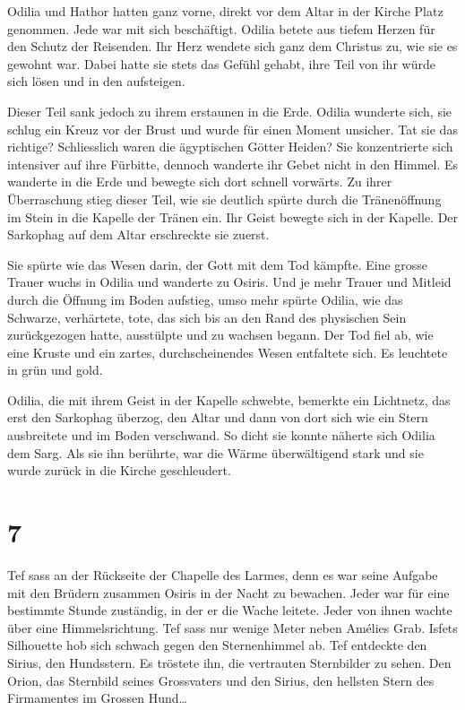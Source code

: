 \sterne

Odilia und Hathor hatten ganz vorne, direkt vor dem Altar in der Kirche Platz genommen. Jede war mit sich beschäftigt. Odilia betete aus tiefem Herzen für den Schutz der Reisenden. Ihr Herz wendete sich ganz dem Christus zu, wie sie es gewohnt war. Dabei hatte sie stets das Gefühl gehabt, ihre Teil von ihr würde sich lösen und in den aufsteigen. 

Dieser Teil sank jedoch zu ihrem erstaunen in die Erde. Odilia wunderte sich, sie schlug ein Kreuz vor der Brust und wurde für einen Moment unsicher. Tat sie das richtige? Schliesslich waren die ägyptischen Götter Heiden? Sie konzentrierte sich intensiver auf ihre Fürbitte, dennoch wanderte ihr Gebet nicht in den Himmel. Es wanderte in die Erde und bewegte sich dort schnell vorwärts. Zu ihrer Überraschung stieg dieser Teil, wie sie deutlich spürte durch die Tränenöffnung im Stein in die Kapelle der Tränen ein. Ihr Geist bewegte sich in der Kapelle. Der Sarkophag auf dem Altar erschreckte sie zuerst. 

Sie spürte wie das Wesen darin, der Gott mit dem Tod kämpfte. Eine grosse Trauer wuchs in Odilia und wanderte zu Osiris. Und je mehr Trauer und Mitleid durch die Öffnung im Boden aufstieg, umso mehr spürte Odilia, wie das Schwarze, verhärtete, tote, das sich bis an den Rand des physischen Sein zurückgezogen hatte, ausstülpte und zu wachsen begann. Der Tod fiel ab, wie eine Kruste und ein zartes, durchscheinendes Wesen entfaltete sich. Es leuchtete in grün und gold.

Odilia, die mit ihrem Geist in der Kapelle schwebte, bemerkte ein Lichtnetz, das erst den Sarkophag überzog, den Altar und dann von dort sich wie ein Stern ausbreitete und im Boden verschwand. So dicht sie konnte näherte sich Odilia dem Sarg.  Als sie ihn berührte, war die Wärme überwältigend stark und sie wurde zurück in die Kirche geschleudert.

\section*{7}

Tef sass an der Rückseite der Chapelle des Larmes, denn es war seine Aufgabe mit den Brüdern zusammen Osiris in der Nacht zu bewachen. Jeder war für eine bestimmte Stunde zuständig, in der er die Wache leitete. Jeder von ihnen wachte über eine Himmelsrichtung. Tef sass nur wenige Meter neben Amélies Grab. Isfets Silhouette hob sich schwach gegen den Sternenhimmel ab. Tef entdeckte den Sirius, den Hundsstern. Es tröstete ihn, die vertrauten Sternbilder zu sehen. Den Orion, das Sternbild seines Grossvaters und den Sirius, den hellsten Stern des Firmamentes im Grossen Hund\dots

